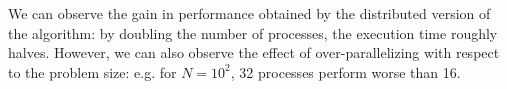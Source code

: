 \documentclass[]{finalproject}
\begin{document}
We can observe the gain in performance obtained by the distributed version of the algorithm:
by doubling the number of processes, the execution time roughly halves.
However, we can also observe the effect of over-parallelizing with respect to the problem size:
e.g. for $N=10^2$, 32 processes perform worse than 16.

\clearpage


\end{document}
